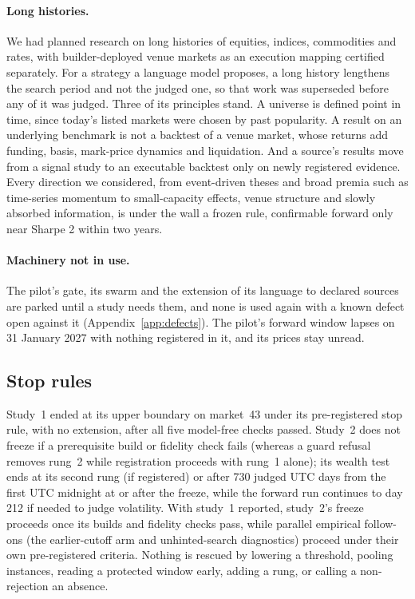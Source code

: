 \documentclass[11pt]{article}
\begin{document}
\paragraph{Long histories.} We had planned research on long histories of equities, indices, commodities and rates, with builder-deployed venue markets as an execution mapping certified separately. For a strategy a language model proposes, a long history lengthens the search period and not the judged one, so that work was superseded before any of it was judged. Three of its principles stand. A universe is defined point in time, since today's listed markets were chosen by past popularity. A result on an underlying benchmark is not a backtest of a venue market, whose returns add funding, basis, mark-price dynamics and liquidation. And a source's results move from a signal study to an executable backtest only on newly registered evidence. Every direction we considered, from event-driven theses and broad premia such as time-series momentum \cite{moskowitz2012,hurst2017} to small-capacity effects, venue structure and slowly absorbed information, is under the wall a frozen rule, confirmable forward only near Sharpe 2 within two years.

\paragraph{Machinery not in use.} The pilot's gate, its swarm and the extension of its language to declared sources are parked until a study needs them, and none is used again with a known defect open against it (Appendix~\ref{app:defects}). The pilot's forward window lapses on 31 January 2027 with nothing registered in it, and its prices stay unread.

\subsection{Stop rules}\label{sec:stop}

Study~1 ended at its upper boundary on market~43 under its pre-registered stop rule, with no extension, after all five model-free checks passed. Study~2 does not freeze if a prerequisite build or fidelity check fails (whereas a guard refusal removes rung~2 while registration proceeds with rung~1 alone); its wealth test ends at its second rung (if registered) or after 730 judged UTC days from the first UTC midnight at or after the freeze, while the forward run continues to day 212 if needed to judge volatility. With study~1 reported, study~2's freeze proceeds once its builds and fidelity checks pass, while parallel empirical follow-ons (the earlier-cutoff arm and unhinted-search diagnostics) proceed under their own pre-registered criteria. Nothing is rescued by lowering a threshold, pooling instances, reading a protected window early, adding a rung, or calling a non-rejection an absence.
\end{document}
